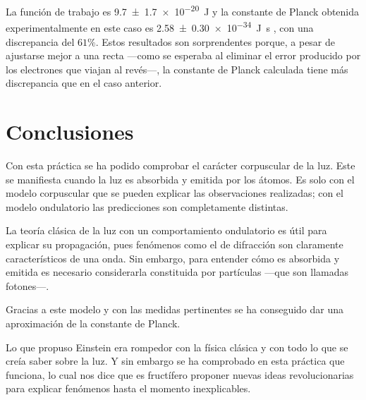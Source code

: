 \documentclass[12pt]{article}
\numberwithin{table}{section}
\numberwithin{figure}{section}
\numberwithin{equation}{section}
\newcommand{\data}[3]{\SI{#1 \pm #2}{#3}}
\begin{document}
La función de trabajo es \data{9.7}{1.7e-20}{J} y la constante de Planck obtenida experimentalmente en este caso es \data{2.58}{0.30e-34}{J s} , con una discrepancia del $61\%$. Estos resultados son sorprendentes porque, a pesar de ajustarse mejor a una recta ---como se esperaba al eliminar el error producido por los electrones que viajan al revés---, la constante de Planck calculada tiene más discrepancia que en el caso anterior.

\section{Conclusiones}
Con esta práctica se ha podido comprobar el carácter corpuscular de la luz. Este se manifiesta cuando la luz es absorbida y emitida por los átomos. Es solo con el modelo corpuscular que se pueden explicar las observaciones realizadas; con el modelo ondulatorio las predicciones son completamente distintas.

La teoría clásica de la luz con un comportamiento ondulatorio es útil para explicar su propagación, pues fenómenos como el de difracción son claramente característicos de una onda. Sin embargo, para entender cómo es absorbida y emitida es necesario considerarla constituida por partículas ---que son llamadas fotones---.

Gracias a este modelo y con las medidas pertinentes se ha conseguido dar una aproximación de la constante de Planck.

Lo que propuso Einstein era rompedor con la física clásica y con todo lo que se creía saber sobre la luz. Y sin embargo se ha comprobado en esta práctica que funciona, lo cual nos dice que es fructífero proponer nuevas ideas revolucionarias para explicar fenómenos hasta el momento inexplicables.
\end{document}
